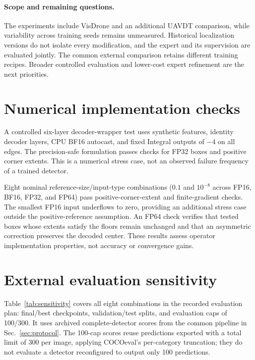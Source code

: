 \paragraph{Scope and remaining questions.}
The experiments include VisDrone and an additional UAVDT comparison, while variability across training seeds remains unmeasured. Historical localization versions do not isolate every modification, and the expert and its supervision are evaluated jointly. The common external comparison retains different training recipes. Broader controlled evaluation and lower-cost expert refinement are the next priorities.

\appendix
\raggedbottom
\section{Numerical implementation checks}
\label{sec:numericalchecks}\label{sec:geometryevidence}
A controlled six-layer decoder-wrapper test uses synthetic features, identity decoder layers, CPU BF16 autocast, and fixed Integral outputs of $-4$ on all edges. The precision-safe formulation passes checks for FP32 boxes and positive corner extents. This is a numerical stress case, not an observed failure frequency of a trained detector.

Eight nominal reference-size/input-type combinations ($0.1$ and $10^{-8}$ across FP16, BF16, FP32, and FP64) pass positive-corner-extent and finite-gradient checks. The smallest FP16 input underflows to zero, providing an additional stress case outside the positive-reference assumption. An FP64 check verifies that tested boxes whose extents satisfy the floors remain unchanged and that an asymmetric correction preserves the decoded center. These results assess operator implementation properties, not accuracy or convergence gains.

\section{External evaluation sensitivity}
\label{sec:sensitivity}
Table~\ref{tab:sensitivity} covers all eight combinations in the recorded evaluation plan: final/best checkpoints, validation/test splits, and evaluation caps of 100/300. It uses archived complete-detector scores from the common pipeline in Sec.~\ref{sec:protocol}. The 100-cap scores reuse predictions exported with a total limit of 300 per image, applying COCOeval's per-category truncation; they do not evaluate a detector reconfigured to output only 100 predictions.

